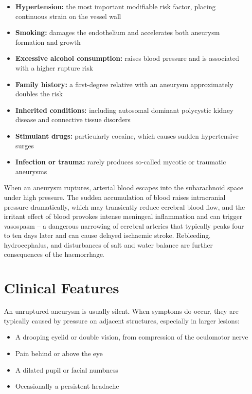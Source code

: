 \begin{itemize}
    \item \textbf{Hypertension:} the most important modifiable risk factor, placing continuous strain on the vessel wall
    \item \textbf{Smoking:} damages the endothelium and accelerates both aneurysm formation and growth
    \item \textbf{Excessive alcohol consumption:} raises blood pressure and is associated with a higher rupture risk
    \item \textbf{Family history:} a first-degree relative with an aneurysm approximately doubles the risk
    \item \textbf{Inherited conditions:} including autosomal dominant polycystic kidney disease and connective tissue disorders
    \item \textbf{Stimulant drugs:} particularly cocaine, which causes sudden hypertensive surges
    \item \textbf{Infection or trauma:} rarely produces so-called mycotic or traumatic aneurysms
\end{itemize}

When an aneurysm ruptures, arterial blood escapes into the subarachnoid space under high pressure. The sudden accumulation of blood raises intracranial pressure dramatically, which may transiently reduce cerebral blood flow, and the irritant effect of blood provokes intense meningeal inflammation and can trigger vasospasm -- a dangerous narrowing of cerebral arteries that typically peaks four to ten days later and can cause delayed ischaemic stroke. Rebleeding, hydrocephalus, and disturbances of salt and water balance are further consequences of the haemorrhage.

\section*{Clinical Features}
An unruptured aneurysm is usually silent. When symptoms do occur, they are typically caused by pressure on adjacent structures, especially in larger lesions:

\begin{itemize}
    \item A drooping eyelid or double vision, from compression of the oculomotor nerve
    \item Pain behind or above the eye
    \item A dilated pupil or facial numbness
    \item Occasionally a persistent headache
\end{itemize}

